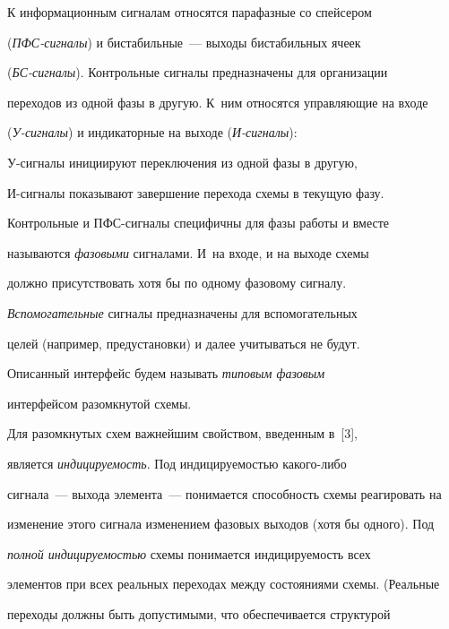       


      К информационным сигналам относятся парафазные со спейсером 


(\textit{ПФС-сиг\-на\-лы}) и бистабильные~--- выходы бистабильных ячеек 


(\textit{БС-сиг\-на\-лы}). Контрольные сигналы предназначены для организации 


переходов из одной фазы в другую. К~ним относятся управляющие на входе 


(\textit{У-сиг\-на\-лы}) и индикаторные на выходе (\textit{И-сиг\-на\-лы}):


      У-сиг\-на\-лы инициируют переключения из одной фазы в другую, 


      И-сиг\-на\-лы показывают завершение перехода схемы в текущую фазу.


      


      Контрольные и ПФС-сигналы специфичны для фазы работы и вместе 


называются \textit{фазовыми} сигналами. И~на входе, и на выходе схемы 


должно присутствовать хотя бы по одному фазовому сигналу.


      


      \textit{Вспомогательные} сигналы предназначены для вспомогательных 


целей (например, предустановки) и далее учитываться не будут.


      


      Описанный интерфейс будем называть \textit{типовым фазовым} 


      интерфейсом разомкнутой схемы.


      Для разомкнутых схем важнейшим свойством, введенным в~[3], 


является \textit{индицируемость}. Под индицируемостью ка\-ко\-го-ли\-бо 


сигнала~--- выхода элемента~--- понимается способность схемы реагировать на 


изменение этого сигнала изменением фазовых выходов (хотя бы одного). Под 


\textit{полной индицируемостью} схемы понимается индицируемость всех 


элементов при всех реальных переходах между состояниями схемы. (Реальные 


переходы должны быть допустимыми, что обеспечивается структурой 


